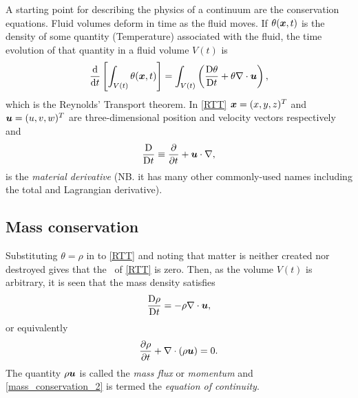 A starting point for describing the physics of a continuum are the conservation equations. Fluid volumes deform in time as the fluid moves. If $\theta({\mbox{\boldmath$x$}},t)$ is the density of some quantity (\eg Temperature) associated with the fluid, the time evolution of that quantity in a fluid volume $V(t)$ is
\begin{equation}\label{RTT}
 \frac{\mathrm{d}}{\mathrm{d} t}\left[\int_{V(t)}\theta({\mbox{\boldmath$x$}},t)\right]=
 \int_{V(t)}\left(\frac{\mathrm{D}\theta}{\mathrm{D} t}+\theta\nabla\cdot{\mbox{\boldmath$u$}}\right),
\end{equation}
which is the Reynolds' Transport theorem. In \eqref{RTT} ${\mbox{\boldmath$x$}}=(x,y,z)^T$ and ${\mbox{\boldmath$u$}}=(u,v,w)^T$ are three-dimensional position and velocity vectors respectively and
\begin{equation}\label{MatDiv}
 \frac{\mathrm{D}}{\mathrm{D} t}\equiv\frac{\partial}{\partial{t}}+{\mbox{\boldmath$u$}}\cdot\nabla,
\end{equation}
is the \textit{material derivative} (NB. it has many other commonly-used names including the total and Lagrangian derivative). 

\subsection{Mass conservation}
Substituting $\theta=\rho$ in to \eqref{RTT} and noting that matter is neither created nor destroyed gives that the \lhs\ of \eqref{RTT} is zero. Then, as the volume $V(t)$ is arbitrary, it is seen that the mass density satisfies
\begin{equation}\label{mass_conservation}
 \frac{\mathrm{D}\rho}{\mathrm{D} t}=-\rho\nabla\cdot{\mbox{\boldmath$u$}},
\end{equation}
or equivalently
\begin{equation}\label{mass_conservation_2}
 \frac{\partial\rho}{\partial{t}}+\nabla\cdot(\rho{\mbox{\boldmath$u$}})=0.
\end{equation}
The quantity $\rho{\mbox{\boldmath$u$}}$ is called the \textit{mass flux} or \textit{momentum} and \eqref{mass_conservation_2} is termed the \textit{equation of continuity}.


